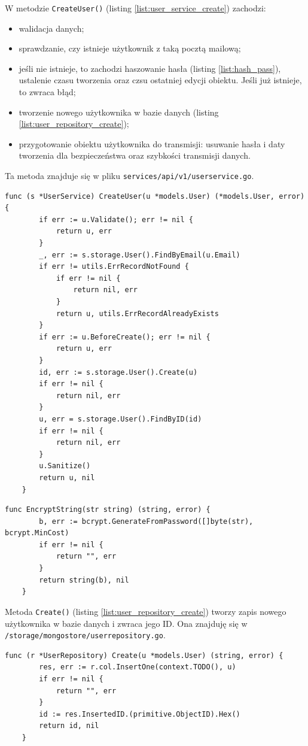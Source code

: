 W metodzie \texttt{CreateUser()} (listing \ref{list:user_service_create}) zachodzi:
\begin{itemize}
    \item walidacja danych;
    \item sprawdzanie, czy istnieje użytkownik z taką pocztą mailową;
    \item jeśli nie istnieje, to zachodzi haszowanie hasła (listing \ref{list:hash_pass}), ustalenie czasu tworzenia oraz czsu ostatniej edycji obiektu. Jeśli już istnieje, to zwraca błąd;
    \item tworzenie nowego użytkownika w bazie danych (listing \ref{list:user_repository_create});
    \item przygotowanie obiektu użytkownika do transmisji: usuwanie hasła i daty tworzenia dla bezpieczeństwa oraz szybkości transmisji danych.
\end{itemize}
Ta metoda znajduje się w pliku \texttt{services/api/v1/userservice.go}.
\begin{lstlisting}[label=list:user_service_create,caption=Serwis tworzenia użytkownika,basicstyle=\tiny\ttfamily]
    func (s *UserService) CreateUser(u *models.User) (*models.User, error) {
        if err := u.Validate(); err != nil {
            return u, err
        }
        _, err := s.storage.User().FindByEmail(u.Email)
        if err != utils.ErrRecordNotFound {
            if err != nil {
                return nil, err
            }
            return u, utils.ErrRecordAlreadyExists
        }
        if err := u.BeforeCreate(); err != nil {
            return u, err
        }
        id, err := s.storage.User().Create(u)
        if err != nil {
            return nil, err
        }
        u, err = s.storage.User().FindByID(id)
        if err != nil {
            return nil, err
        }
        u.Sanitize()
        return u, nil
    }
\end{lstlisting}
\begin{lstlisting}[label=list:hash_pass,caption=Haszowanie hasła,basicstyle=\tiny\ttfamily]
    func EncryptString(str string) (string, error) {
        b, err := bcrypt.GenerateFromPassword([]byte(str), bcrypt.MinCost)
        if err != nil {
            return "", err
        }
        return string(b), nil
    }
\end{lstlisting}

Metoda \texttt{Create()} (listing \ref{list:user_repository_create}) tworzy zapis nowego użytkownika w bazie danych i zwraca jego ID.
Ona znajduję się w \texttt{/storage/mongostore/userrepository.go}.
\begin{lstlisting}[label=list:user_repository_create,caption=Zachowanie użytkownika do bazy danych,basicstyle=\tiny\ttfamily]
    func (r *UserRepository) Create(u *models.User) (string, error) {
        res, err := r.col.InsertOne(context.TODO(), u)
        if err != nil {
            return "", err
        }
        id := res.InsertedID.(primitive.ObjectID).Hex()
        return id, nil
    }
\end{lstlisting}

